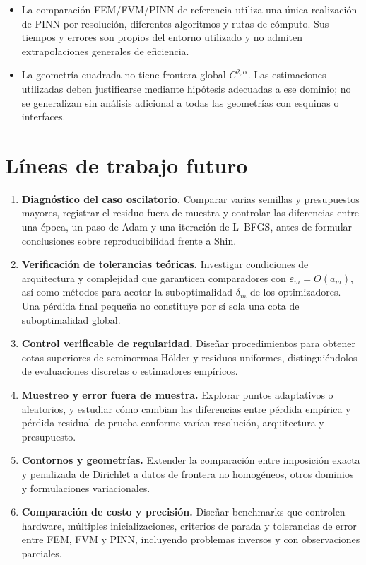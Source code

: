 \begin{itemize}
\item La comparación FEM/FVM/PINN de referencia utiliza una única realización de PINN por resolución, diferentes algoritmos y rutas de cómputo. Sus tiempos y errores son propios del entorno utilizado y no admiten extrapolaciones generales de eficiencia.
\item La geometría cuadrada no tiene frontera global $C^{2,\alpha}$. Las estimaciones utilizadas deben justificarse mediante hipótesis adecuadas a ese dominio; no se generalizan sin análisis adicional a todas las geometrías con esquinas o interfaces.
\end{itemize}

\section{Líneas de trabajo futuro}

\begin{enumerate}
\item \textbf{Diagnóstico del caso oscilatorio.} Comparar varias semillas y presupuestos mayores, registrar el residuo fuera de muestra y controlar las diferencias entre una época, un paso de Adam y una iteración de L--BFGS, antes de formular conclusiones sobre reproducibilidad frente a Shin.
\item \textbf{Verificación de tolerancias teóricas.} Investigar condiciones de arquitectura y complejidad que garanticen comparadores con $\varepsilon_m=O(a_m)$, así como métodos para acotar la suboptimalidad $\delta_m$ de los optimizadores. Una pérdida final pequeña no constituye por sí sola una cota de suboptimalidad global.
\item \textbf{Control verificable de regularidad.} Diseñar procedimientos para obtener cotas superiores de seminormas H\"older y residuos uniformes, distinguiéndolos de evaluaciones discretas o estimadores empíricos.
\item \textbf{Muestreo y error fuera de muestra.} Explorar puntos adaptativos o aleatorios, y estudiar cómo cambian las diferencias entre pérdida empírica y pérdida residual de prueba conforme varían resolución, arquitectura y presupuesto.
\item \textbf{Contornos y geometrías.} Extender la comparación entre imposición exacta y penalizada de Dirichlet a datos de frontera no homogéneos, otros dominios y formulaciones variacionales.
\item \textbf{Comparación de costo y precisión.} Diseñar benchmarks que controlen hardware, múltiples inicializaciones, criterios de parada y tolerancias de error entre FEM, FVM y PINN, incluyendo problemas inversos y con observaciones parciales.
\end{enumerate}
